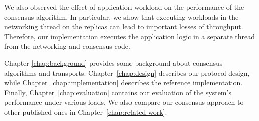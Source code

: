 We also observed the effect of application workload on the performance of the consensus algorithm.
In particular, we show that executing workloads in the networking thread on the replicas can lead to important losses of throughput.
Therefore, our implementation executes the application logic in a separate thread from the networking and consensus code.

Chapter \ref{chap:background} provides some background about consensus algorithms and transports.
Chapter~\ref{chap:design} describes our protocol design, while Chapter~\ref{chap:implementation} describes the reference implementation.
Finally, Chapter~\ref{chap:evaluation} contains our evaluation of the system's performance under various loads.
We also compare our consensus approach to other published ones in Chapter~\ref{chap:related-work}.
